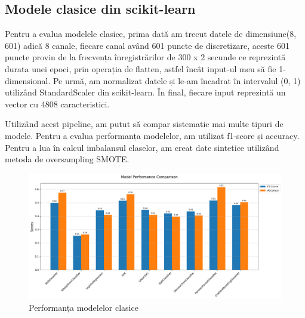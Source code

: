 \subsection{Modele clasice din scikit-learn}
Pentru a evalua modelele clasice, prima dată am trecut datele de dimensiune(8, 601) adică 8 canale, fiecare canal având 601 puncte de discretizare, aceste 601 puncte provin de la frecvența înregistrărilor de 300 x 2 secunde ce reprezintă durata unei epoci, prin operația de flatten, astfel încât input-ul meu să fie 1-dimensional. Pe urmă, am normalizat datele și le-am încadrat în intervalul (0, 1) utilizând StandardScaler din scikit-learn\cite{scikit-learn}. În final, fiecare input reprezintă un vector cu 4808 caracteristici.


Utilizând acest pipeline, am putut să compar sistematic mai multe tipuri de modele. Pentru a evalua performanța modelelor, am utilizat f1-score și accuracy. Pentru a lua în calcul imbalansul claselor, am creat date sintetice utilizând metoda de oversampling SMOTE\cite{imblearn}. %

\vspace{1em}
\begin{figure}[h]
    \centering
    \includegraphics[width=1\textwidth]{images/comparatie_modele_clasice_unweighted.png}
    \caption{Performanța modelelor clasice}
    \label{fig:enter-label}
\end{figure}

